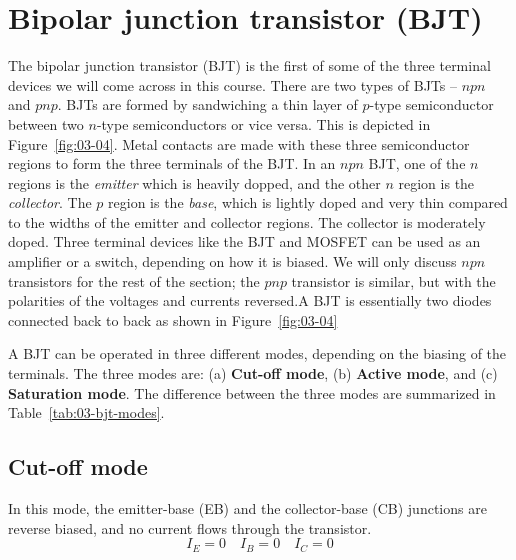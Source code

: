 \section{Bipolar junction transistor (BJT)}
The bipolar junction transistor (BJT) is the first of some of the three terminal devices we will come across in this course. There are two types of BJTs -- $npn$ and $pnp$. BJTs are formed by sandwiching a thin layer of $p$-type semiconductor between two $n$-type semiconductors or vice versa. This is depicted in Figure~\ref{fig:03-04}. Metal contacts are made with these three semiconductor regions to form the three terminals of the BJT. In an $npn$ BJT, one of the  $n$ regions is the \textit{emitter} which is heavily dopped, and the other $n$ region is the \textit{collector}. The $p$ region is the \textit{base}, which is lightly doped and very thin compared to the widths of the emitter and collector regions. The collector is moderately doped. Three terminal devices like the BJT and MOSFET can be used as an amplifier or a switch, depending on how it is biased. We will only discuss $npn$ transistors for the rest of the section; the $pnp$ transistor is similar, but with the polarities of the voltages and currents reversed.A BJT is essentially two diodes connected back to back as shown in Figure~\ref{fig:03-04}

A BJT can be operated in three different modes, depending on the biasing of the terminals. The three modes are: (a) \textbf{Cut-off mode}, (b) \textbf{Active mode}, and (c) \textbf{Saturation mode}. The difference between the three modes are summarized in Table~\ref{tab:03-bjt-modes}.
\subsection{Cut-off mode}
In this mode, the emitter-base (EB) and the collector-base (CB) junctions are reverse biased, and no current flows through the transistor.
\begin{equation}
    I_E = 0 \quad I_B = 0 \quad I_C = 0
    \label{eq:03-bjt-cutoff}
\end{equation}
